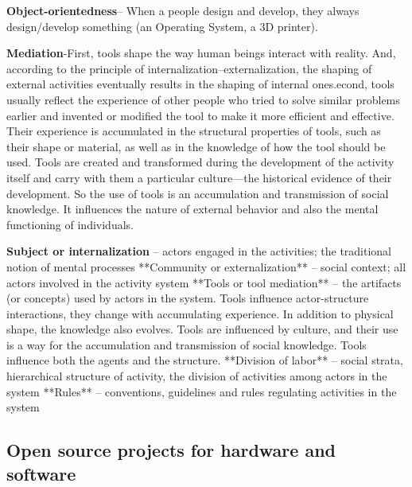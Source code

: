 \documentclass{ICED-Paper}%
\begin{document}
\bigskip
\textbf{Object-orientedness}– When a people design and develop, they always design/develop something (an Operating System, a 3D printer). 
\bigskip

\textbf{Mediation}-First, tools shape the way human beings interact with reality. And, according to the principle of internalization–externalization, the shaping of external activities eventually results in the shaping of internal ones.econd,
tools usually reflect the experience of other people who tried to solve similar problems earlier and invented or modified the tool to make it more efficient and effective. Their experience is accumulated in the structural properties of tools, such as their shape or material, as well as in the knowledge of how the tool should be used. Tools are created and transformed during the development of the activity itself and carry with them a particular culture—the historical evidence of their development. So the use of tools is an accumulation and transmission of social knowledge. It influences the nature of external behavior and also the mental functioning of individuals.


\textbf{Subject or internalization} – actors engaged in the activities; the traditional notion of mental processes
**Community or externalization** – social context; all actors involved in the activity system
**Tools or tool mediation** – the artifacts (or concepts) used by actors in the system. Tools influence actor-structure interactions, they change with accumulating experience. In addition to physical shape, the knowledge also evolves. Tools are influenced by culture, and their use is a way for the accumulation and transmission of social knowledge. Tools influence both the agents and the structure.
**Division of labor** – social strata, hierarchical structure of activity, the division of activities among actors in the system
**Rules** – conventions, guidelines and rules regulating activities in the system


\subsection{Open source projects for hardware and software}
\end{document}
